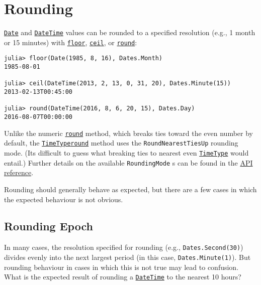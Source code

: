 \hypertarget{12464510960418657842}{}


\section{Rounding}



\hyperlink{4488183467971164548}{\texttt{Date}} and \hyperlink{17572689933274889838}{\texttt{DateTime}} values can be rounded to a specified resolution (e.g., 1 month or 15 minutes) with \hyperlink{11115257331910840693}{\texttt{floor}}, \hyperlink{10519509038312853061}{\texttt{ceil}}, or \hyperlink{12930779325193350739}{\texttt{round}}:




\begin{verbatim}
julia> floor(Date(1985, 8, 16), Dates.Month)
1985-08-01

julia> ceil(DateTime(2013, 2, 13, 0, 31, 20), Dates.Minute(15))
2013-02-13T00:45:00

julia> round(DateTime(2016, 8, 6, 20, 15), Dates.Day)
2016-08-07T00:00:00
\end{verbatim}



Unlike the numeric \hyperlink{12930779325193350739}{\texttt{round}} method, which breaks ties toward the even number by default, the \hyperlink{4438614350756187528}{\texttt{TimeType}}\hyperlink{12930779325193350739}{\texttt{round}} method uses the \texttt{RoundNearestTiesUp} rounding mode. (It{\textquotesingle}s difficult to guess what breaking ties to nearest {\textquotedbl}even{\textquotedbl} \hyperlink{4438614350756187528}{\texttt{TimeType}} would entail.) Further details on the available \texttt{RoundingMode} s can be found in the \hyperlink{2504340439131318713}{API reference}.



Rounding should generally behave as expected, but there are a few cases in which the expected behaviour is not obvious.



\hypertarget{18235125897086797691}{}


\subsection{Rounding Epoch}



In many cases, the resolution specified for rounding (e.g., \texttt{Dates.Second(30)}) divides evenly into the next largest period (in this case, \texttt{Dates.Minute(1)}). But rounding behaviour in cases in which this is not true may lead to confusion. What is the expected result of rounding a \hyperlink{17572689933274889838}{\texttt{DateTime}} to the nearest 10 hours?




